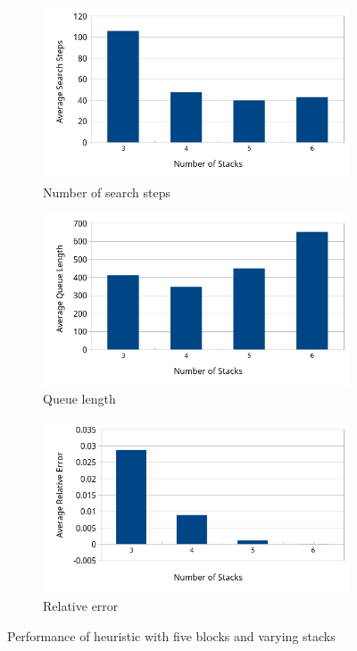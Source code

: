 \documentclass{article}
\begin{document}
\begin{figure}[h]
    \centering
    \begin{subfigure}{\linewidth}
	\centering
	\includegraphics[width=.65\linewidth]{H2_AvgStepsVsStacks.png}\hfill
	\caption{Number of search steps}
    \end{subfigure}\par\medskip
    \begin{subfigure}{\linewidth}
	\centering
	\includegraphics[width=.65\linewidth]{H2_AvgQLVsStacks.png}\hfill
	\caption{Queue length}
    \end{subfigure}\par\medskip
    \begin{subfigure}{\linewidth}
	\centering
	\includegraphics[width=.65\linewidth]{H2_AvgRelErrVsStacks.png}\hfill
	\caption{Relative error}
    \end{subfigure}
    \caption{Performance of heuristic with five blocks and varying stacks}
    \label{fig:heuristic}
\end{figure}
\end{document}
